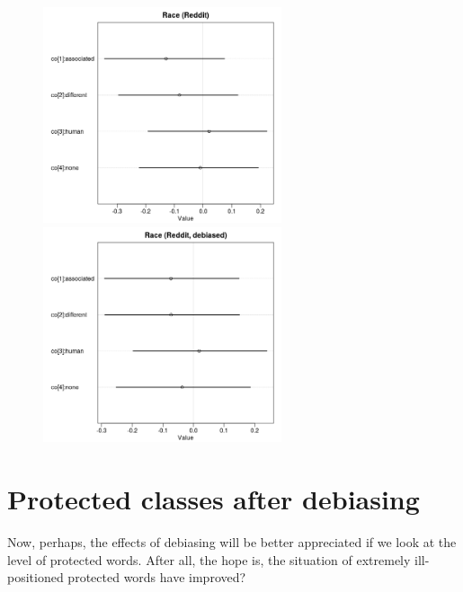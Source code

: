 \documentclass[
  12pt,
]{book}
\begin{document}
\begin{center}
\begin{figure}[!htb]
   
  \begin{minipage}{0.55\textwidth}
\includegraphics[width=7cm]{../images/raceCoeffs.jpeg}
\end{minipage}
   \begin {minipage}{0.43\textwidth}
    \includegraphics[width=7cm]{../images/debiasedRaceRedditCoeffs.jpeg}
   \end{minipage}
\end{figure}

\end{center}

\hypertarget{protected-classes-after-debiasing}{%
\section{Protected classes after debiasing}\label{protected-classes-after-debiasing}}

Now, perhaps, the effects of debiasing will be better appreciated if we look at the level of protected words. After all, the hope is, the situation of extremely ill-positioned protected words have improved?
\end{document}
